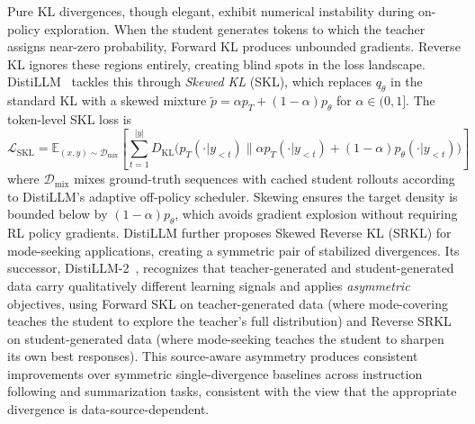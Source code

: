 \documentclass{article} %
\newcommand{\E}{\mathbb{E}}
\newcommand{\KL}{D_{\mathrm{KL}}}
\newcommand{\ptheta}{p_\theta}
\newcommand{\pteacher}{p_T}
\newcommand{\loss}{\mathcal{L}}
\begin{document}
Pure KL divergences, though elegant, exhibit numerical instability during on-policy exploration. When the student generates tokens to which the teacher assigns near-zero probability, Forward KL produces unbounded gradients. Reverse KL ignores these regions entirely, creating blind spots in the loss landscape. DistiLLM~\citep{2402.03898} tackles this through \emph{Skewed KL} (SKL), which replaces $q_\theta$ in the standard KL with a skewed mixture $\tilde{p} = \alpha \pteacher + (1-\alpha)\ptheta$ for $\alpha \in (0,1]$. The token-level SKL loss is
\begin{equation}
    \loss_{\text{SKL}} = \E_{(x,y) \sim \mathcal{D}_{\text{mix}}} \left[ \sum_{t=1}^{|y|} \KL\big(\pteacher(\cdot|y_{<t}) \parallel \alpha \pteacher(\cdot|y_{<t}) + (1-\alpha) \ptheta(\cdot|y_{<t})\big) \right]
\end{equation}
where $\mathcal{D}_{\text{mix}}$ mixes ground-truth sequences with cached student rollouts according to DistiLLM's adaptive off-policy scheduler.
Skewing ensures the target density is bounded below by $(1-\alpha)\ptheta$, which avoids gradient explosion without requiring RL policy gradients. DistiLLM further proposes Skewed Reverse KL (SRKL) for mode-seeking applications, creating a symmetric pair of stabilized divergences. Its successor, DistiLLM-2~\citep{2503.07067}, recognizes that teacher-generated and student-generated data carry qualitatively different learning signals and applies \emph{asymmetric} objectives, using Forward SKL on teacher-generated data (where mode-covering teaches the student to explore the teacher's full distribution) and Reverse SRKL on student-generated data (where mode-seeking teaches the student to sharpen its own best responses). This source-aware asymmetry produces consistent improvements over symmetric single-divergence baselines across instruction following and summarization tasks, consistent with the view that the appropriate divergence is data-source-dependent.
\end{document}
